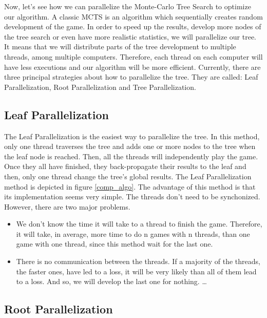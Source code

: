 Now, let’s see how we can parallelize the Monte-Carlo Tree Search to optimize our algorithm. A classic MCTS is an algorithm which sequentially creates random development of the game. In order to speed up the results, develop more nodes of the tree search or even have more realistic statistics, we will parallelize our tree. It means that we will distribute parts of the tree development to multiple threads, among multiple computers. Therefore, each thread on each computer will have less executions and our algorithm will be more efficient.
\newline
\newline
Currently, there are three principal strategies about how to parallelize the tree. They are called: Leaf Parallelization, Root Parallelization and Tree Parallelization.

\subsection{Leaf Parallelization}

The Leaf Parallelization is the easiest way to parallelize the tree. In this method, only one thread traverses the tree and adds one or more nodes to the tree when the leaf node is reached. Then, all the threads will independently play the game. Once they all have finished, they back-propagate their results to the leaf and then, only one thread change the tree’s global results. The Leaf Parallelization method is depicted in figure \ref{comp_algo}.
\newline
\newline
The advantage of this method is that its implementation seems very simple. The threads don't need to be synchonized. However, there are two major problems.
\begin{itemize}
     \item We don’t know the time it will take to a thread to finish the game. Therefore, it will take, in average, more time to do n games with n threads, than one game with one thread, since this method wait for the last one.
     \item There is no communication between the threads. If a majority of the threads, the faster ones, have led to a loss, it will be very likely than all of them lead to a loss. And so, we will develop the last one for nothing. \ldots
  \end{itemize}

\subsection{Root Parallelization}

